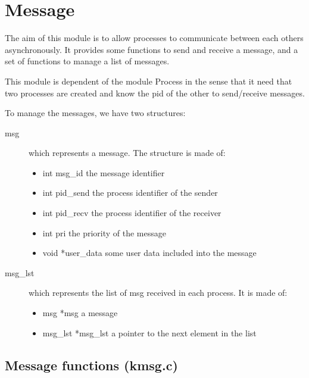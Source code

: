 \section{Message}
The aim of this module is to allow processes to communicate between each
others asynchronously.
It provides some functions to send and receive a message, and a set of
functions to manage a list of messages.

This module is dependent of the module Process in the sense that it need that
two processes are created and know the pid of the other to send/receive messages.

To manage the messages, we have two structures:
\begin{description}
\item[msg] which represents a message. The structure is made of:
	\begin{itemize}
		\item{int msg\_id} the message identifier
		\item{int pid\_send} the process identifier of the sender
		\item{int pid\_recv} the process identifier of the receiver
		\item{int pri} the priority of the message
		\item{void *user\_data} some user data included into the message
	\end{itemize}
\item[msg\_lst] which represents the list of msg received in each process.
				It is made of:
	\begin{itemize}
	\item{msg *msg} a message
	\item{msg\_lst *msg\_lst} a pointer to the next element in the list
	\end{itemize}
				
\end{description}


\subsection{Message functions (kmsg.c)}

